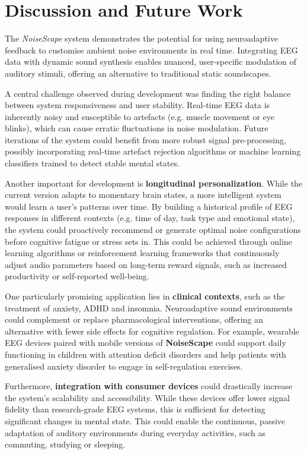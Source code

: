 \section{Discussion and Future Work}

The \textit{NoiseScape} system demonstrates the potential for using neuroadaptive feedback to customise ambient noise environments in real time. Integrating EEG data with dynamic sound synthesis enables nuanced, user-specific modulation of auditory stimuli, offering an alternative to traditional static soundscapes.

A central challenge observed during development was finding the right balance between system responsiveness and user stability. Real-time EEG data is inherently noisy and susceptible to artefacts (e.g. muscle movement or eye blinks), which can cause erratic fluctuations in noise modulation. Future iterations of the system could benefit from more robust signal pre-processing, possibly incorporating real-time artefact rejection algorithms or machine learning classifiers trained to detect stable mental states.

Another important for development is \textbf{longitudinal personalization}.  While the current version adapts to momentary brain states, a more intelligent system would learn a user’s patterns over time. By building a historical profile of EEG responses in different contexts (e.g. time of day, task type and emotional state), the system could proactively recommend or generate optimal noise configurations before cognitive fatigue or stress sets in. This could be achieved through online learning algorithms or reinforcement learning frameworks that continuously adjust audio parameters based on long-term reward signals, such as increased productivity or self-reported well-being.

One particularly promising application lies in \textbf{clinical contexts}, such as the treatment of anxiety, ADHD and insomnia. Neuroadaptive sound environments could complement or replace pharmacological interventions, offering an alternative with fewer side effects for cognitive regulation. For example, wearable EEG devices paired with mobile versions of \textbf{NoiseScape} could support daily functioning in children with attention deficit disorders and help patients with generalised anxiety disorder to engage in self-regulation exercises.

Furthermore, \textbf{integration with consumer devices} could drastically increase the system's scalability and accessibility. While these devices offer lower signal fidelity than research-grade EEG systems, this is sufficient for detecting significant changes in mental state. This could enable the continuous, passive adaptation of auditory environments during everyday activities, such as commuting, studying or sleeping.

